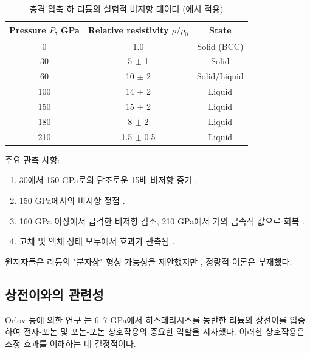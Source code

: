 \documentclass[11pt,a4paper]{article}
\theoremstyle{remark}
\begin{document}
	\begin{table}[H]
		\begin{otherlanguage}{english}
			\centering
			\caption{Experimental lithium resistivity data under shock compression (adapted from \cite{fortov2001, yakushev2002})}
			\label{tab:exp_data}
			\begin{tabular}{ccc}
				\toprule
				Pressure \(P\), GPa & Relative resistivity \(\rho/\rho_0\) & State \\
				\midrule
				0 & 1.0 & Solid (BCC) \\
				30 & 5 \(\pm\) 1 & Solid \\
				60 & 10 \(\pm\) 2 & Solid/Liquid \\
				100 & 14 \(\pm\) 2 & Liquid \\
				150 & 15 \(\pm\) 2 & Liquid \\
				180 & 8 \(\pm\) 2 & Liquid \\
				210 & 1.5 \(\pm\) 0.5 & Liquid \\
				\bottomrule
			\end{tabular}
		\end{otherlanguage}
		\caption{충격 압축 하 리튬의 실험적 비저항 데이터 (\cite{fortov2001, yakushev2002}에서 적용)}
	\end{table}
	
	주요 관측 사항:
	\begin{enumerate}
		\item 30에서 150 GPa로의 단조로운 15배 비저항 증가 \cite{fortov2001}.
		\item 150 GPa에서의 비저항 정점 \cite{yakushev2002}.
		\item 160 GPa 이상에서 급격한 비저항 감소, 210 GPa에서 거의 금속적 값으로 회복 \cite{yakushev2002}.
		\item 고체 및 액체 상태 모두에서 효과가 관측됨 \cite{fortov2001}.
	\end{enumerate}
	
	원저자들은 리튬의 "분자상" 형성 가능성을 제안했지만 \cite{fortov1999}, 정량적 이론은 부재했다.
	
	\subsection{상전이와의 관련성}
	
	Orlov 등에 의한 연구 \cite{orlov2001}는 6–7 GPa에서 히스테리시스를 동반한 리튬의 상전이를 입증하여 전자-포논 및 포논-포논 상호작용의 중요한 역할을 시사했다. 이러한 상호작용은 조정 효과를 이해하는 데 결정적이다.
	
\end{document}
